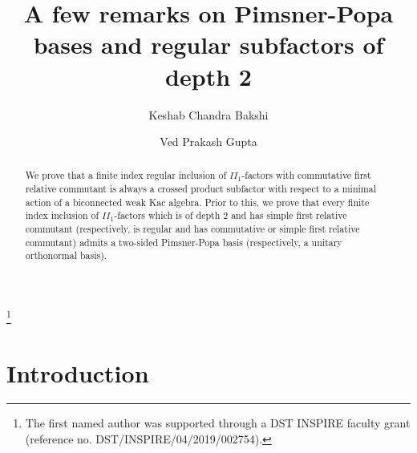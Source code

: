 \documentclass{amsart}
\theoremstyle{definition}
\theoremstyle{theorem}
\begin{document}
 \title[Bases and regular subfactors]{A few remarks on Pimsner-Popa bases
   and regular subfactors of depth 2}


 \author[K C Bakshi]{Keshab Chandra Bakshi}
 \address{Chennai Mathematical Institute, Chennai, INDIA}

\thanks{The first named author was supported through a DST
  INSPIRE faculty grant (reference  no. DST/INSPIRE/04/2019/002754).}

\author[V P Gupta]{Ved Prakash Gupta} \address{School of Physical
  Sciences, Jawaharlal Nehru University, New Delhi, INDIA}

\maketitle

\begin{abstract}
We prove that a finite index regular inclusion of
    $II_1$-factors with commutative first relative commutant is always
    a crossed product subfactor with respect to a minimal action of a
    biconnected weak Kac algebra. Prior to this, we prove that every
  finite index inclusion of $II_1$-factors which is of depth $2$ and
  has simple first relative commutant (respectively, is regular and
  has commutative or simple first relative commutant) admits a
  two-sided Pimsner-Popa basis (respectively, a unitary orthonormal
  basis).\\
\end{abstract}


 
 \section{Introduction}
\end{document}
